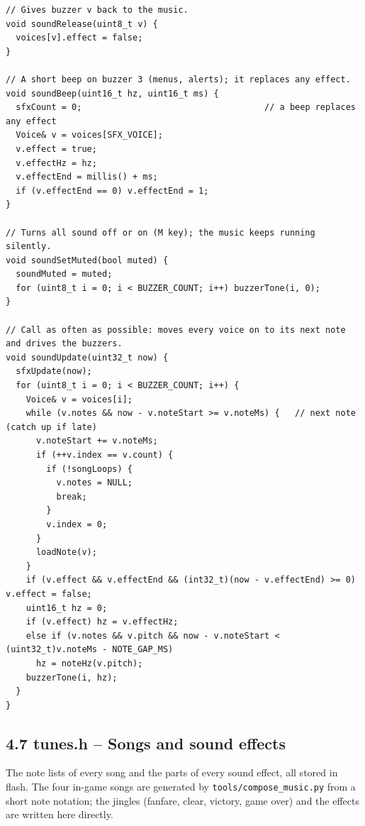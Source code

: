 \documentclass[11pt,a4paper]{article}
\begin{document}
\begin{lstlisting}[language=Arduino]
// Gives buzzer v back to the music.
void soundRelease(uint8_t v) {
  voices[v].effect = false;
}

// A short beep on buzzer 3 (menus, alerts); it replaces any effect.
void soundBeep(uint16_t hz, uint16_t ms) {
  sfxCount = 0;                                    // a beep replaces any effect
  Voice& v = voices[SFX_VOICE];
  v.effect = true;
  v.effectHz = hz;
  v.effectEnd = millis() + ms;
  if (v.effectEnd == 0) v.effectEnd = 1;
}

// Turns all sound off or on (M key); the music keeps running silently.
void soundSetMuted(bool muted) {
  soundMuted = muted;
  for (uint8_t i = 0; i < BUZZER_COUNT; i++) buzzerTone(i, 0);
}

// Call as often as possible: moves every voice on to its next note and drives the buzzers.
void soundUpdate(uint32_t now) {
  sfxUpdate(now);
  for (uint8_t i = 0; i < BUZZER_COUNT; i++) {
    Voice& v = voices[i];
    while (v.notes && now - v.noteStart >= v.noteMs) {   // next note (catch up if late)
      v.noteStart += v.noteMs;
      if (++v.index == v.count) {
        if (!songLoops) {
          v.notes = NULL;
          break;
        }
        v.index = 0;
      }
      loadNote(v);
    }
    if (v.effect && v.effectEnd && (int32_t)(now - v.effectEnd) >= 0) v.effect = false;
    uint16_t hz = 0;
    if (v.effect) hz = v.effectHz;
    else if (v.notes && v.pitch && now - v.noteStart < (uint32_t)v.noteMs - NOTE_GAP_MS)
      hz = noteHz(v.pitch);
    buzzerTone(i, hz);
  }
}
\end{lstlisting}

\clearpage
\subsection*{4.7 tunes.h – Songs and sound effects}
The note lists of every song and the parts of every sound effect, all stored in flash. The four in-game songs are generated by \texttt{tools/compose\_music.py} from a short note notation; the jingles (fanfare, clear, victory, game over) and the effects are written here directly.
\end{document}

